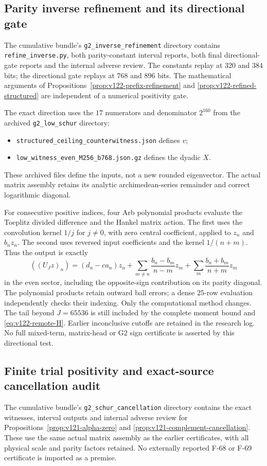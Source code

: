 \documentclass[11pt]{article}
\theoremstyle{remark}
\begin{document}
\subsection{Parity inverse refinement and its directional gate}
\label{app:v122-inverse}
The cumulative bundle's \texttt{g2\_inverse\_refinement} directory
contains \texttt{refine\_inverse.py}, both parity-constant interval
reports, both final directional-gate reports and the internal adverse
review. The constants replay at $320$ and $384$ bits; the directional
gate replays at $768$ and $896$ bits. The mathematical arguments of
Propositions~\ref{prop:v122-prefix-refinement} and
\ref{prop:v122-refined-structured} are independent of a numerical
positivity gate.

The exact direction uses the $17$ numerators and denominator $2^{160}$
from the archived \texttt{g2\_low\_schur} directory:
\begin{itemize}[nosep]
\item \nolinkurl{structured_ceiling_counterwitness.json} defines $v$;
\item \nolinkurl{low_witness_even_M256_b768.json.gz} defines the dyadic $X$.
\end{itemize}
These archived files define the inputs, not a new rounded eigenvector.
The actual matrix assembly retains its analytic archimedean-series
remainder and correct logarithmic diagonal.

For consecutive positive indices, four Arb polynomial products
evaluate the Toeplitz divided difference and the Hankel matrix action.
The first uses the convolution kernel $1/j$ for $j\ne0$, with zero
central coefficient, applied to $z_n$ and $b_nz_n$. The second
uses reversed input coefficients and the kernel $1/(n+m)$.
Thus the output is exactly
\[
 ((U_Jz)_n)=(d_n-ca_n)z_n+
 \sum_{m\ne n}\frac{b_n-b_m}{n-m}z_m+
 \sum_m\frac{b_n+b_m}{n+m}z_m
\]
in the even sector, including the opposite-sign contribution on its
parity diagonal. The polynomial products retain outward ball errors;
a dense $25$-row evaluation independently checks their indexing.
Only the computational method changes. The tail beyond $J=65536$
is still included by the complete moment bound and
\eqref{eq:v122-remote-H}. Earlier inconclusive cutoffs are retained
in the research log. No full mixed-term, matrix-head or G2 sign
certificate is asserted by this directional test.

\subsection{Finite trial positivity and exact-source cancellation audit}
\label{app:v121-audit}
The cumulative bundle's \texttt{g2\_schur\_cancellation} directory
contains the exact witnesses, interval outputs and internal adverse
review for Propositions~\ref{prop:v121-alpha-zero} and
\ref{prop:v121-complement-cancellation}. These use the same actual
matrix assembly as the earlier certificates, with all physical scale
and parity factors retained. No externally reported F-68 or F-69
certificate is imported as a premise.
\end{document}
